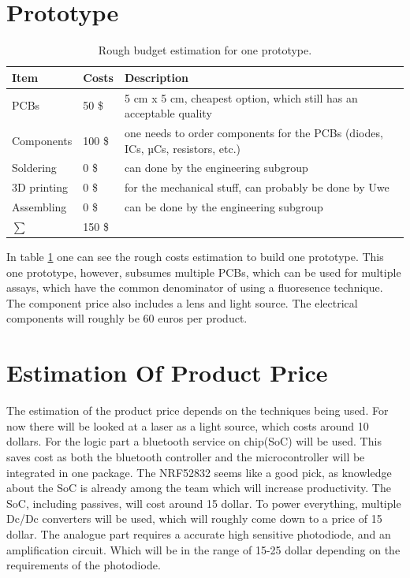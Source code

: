 \documentclass{report}
\begin{document}
\section{Prototype}
\begin{table}[H]
\centering
\begin{tabular}{lll}
\textbf{Item} & \textbf{Costs} & \textbf{Description}                                                           \\\hline
PCBs          & 50 \$          & 5 cm x 5 cm, cheapest option, which still has an acceptable quality            \\
Components    & 100 \$         & one needs to order components for the PCBs (diodes, ICs, µCs, resistors, etc.) \\
Soldering     & 0 \$           & can done by the engineering subgroup                                           \\
3D printing   & 0 \$           & for the mechanical stuff, can probably be done by Uwe                          \\
Assembling    & 0 \$           & can be done by the engineering subgroup                                       	\\\hline
\ensuremath{\sum}& 150 \$
\end{tabular}
\caption{Rough budget estimation for one prototype.}
\label{tab:prototype_budget}
\end{table}
In table \ref{tab:prototype_budget} one can see the rough costs estimation to build one prototype. This one prototype, however, subsumes multiple PCBs, which can be used for multiple assays, which have the common denominator of using a fluoresence technique. The component price also includes a lens and light source. The electrical components will roughly be 60 euros per product.
\section{Estimation Of Product Price}
The estimation of the product price depends on the techniques being used. For now there will be looked at a laser as a light source, which costs around 10 dollars. For the logic part a bluetooth service on chip(SoC) will be used. This saves cost as both the bluetooth controller and the microcontroller will be integrated in one package. The NRF52832 seems like a good pick, as knowledge about the SoC is already among the team which will increase productivity. The SoC, including passives, will cost around 15 dollar. To power everything, multiple Dc/Dc converters will be used, which will roughly come down to a price of 15 dollar. The analogue part requires a accurate high sensitive photodiode, and an amplification circuit. Which will be in the range of 15-25 dollar depending on the requirements of the photodiode. 
\end{document}
